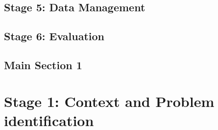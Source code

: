 \subsection{Stage 5: Data Management}



\subsection{Stage 6: Evaluation}


\subsection{Main Section 1}















\section{Stage 1: Context and Problem identification}

